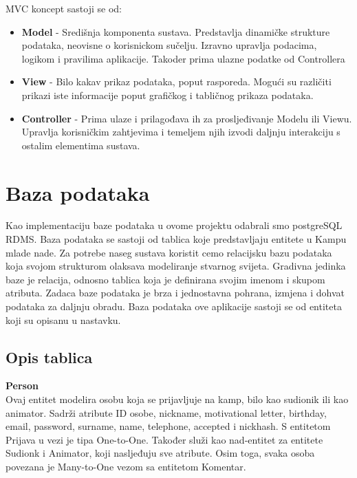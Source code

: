 MVC koncept sastoji se od:
\begin{itemize}
	\item \textbf{Model} -  Središnja komponenta sustava. Predstavlja dinamičke strukture podataka, neovisne o korisnickom sučelju. Izravno upravlja podacima, logikom
	i pravilima aplikacije. Takoder prima ulazne podatke od Controllera
	\item \textbf{View} - Bilo kakav prikaz podataka, poput rasporeda. Mogući su različiti prikazi iste informacije poput grafičkog i tabličnog prikaza podataka.
	\item \textbf{Controller} - Prima ulaze i prilagođava ih za prosljeđivanje Modelu ili Viewu. Upravlja korisničkim zahtjevima i temeljem njih izvodi daljnju interakciju s ostalim elementima sustava.
\end{itemize}





\pagebreak

\section{Baza podataka}

Kao implementaciju baze podataka u ovome projektu odabrali smo
postgreSQL RDMS. Baza podataka se sastoji od tablica koje
predstavljaju entitete u Kampu mlade nade. Za potrebe naseg sustava koristit cemo relacijsku bazu podataka koja svojom strukturom olaksava modeliranje stvarnog svijeta. Gradivna jedinka baze je relacija, odnosno tablica koja je definirana svojim imenom i skupom atributa. Zadaca baze podataka je brza i jednostavna pohrana, izmjena i dohvat podataka za daljnju obradu. Baza podataka ove aplikacije sastoji se od entiteta koji su opisanu u nastavku.
\vspace{5mm} %
\subsection{Opis tablica}
\vspace{5mm} %
\textbf{Person}
\\ Ovaj entitet modelira osobu koja se prijavljuje na kamp, bilo kao sudionik ili kao animator. Sadrži atribute ID osobe, nickname, motivational letter, birthday, email, password, surname, name, telephone, accepted i nickhash. S entitetom Prijava u vezi je tipa One-to-One. Također služi kao nad-entitet za entitete Sudionk i Animator, koji nasljeđuju sve atribute. Osim toga, svaka osoba povezana je Many-to-One vezom sa entitetom Komentar.

